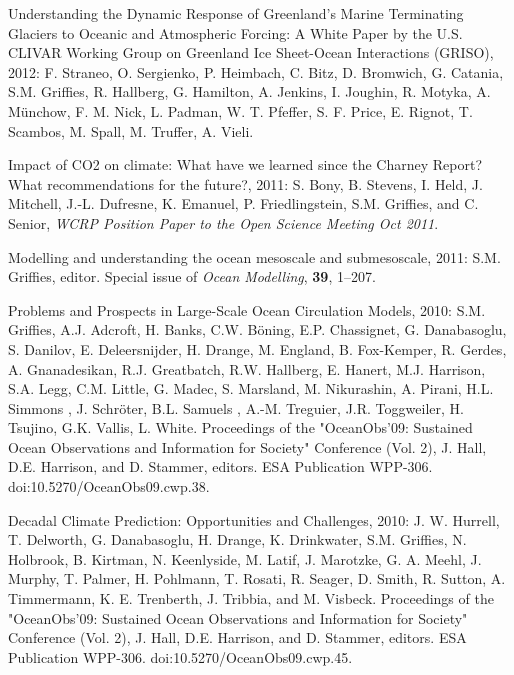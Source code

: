 \begin{etaremune}
\item Understanding the Dynamic Response of Greenland’s Marine
  Terminating Glaciers to Oceanic and Atmospheric Forcing: A White
  Paper by the U.S. CLIVAR Working Group on Greenland Ice Sheet-Ocean
  Interactions (GRISO), 2012: F. Straneo, O. Sergienko, P. Heimbach,
  C. Bitz, D. Bromwich, G. Catania, S.M. Grif\/f\/ies, R.
  Hallberg, G. Hamilton, A. Jenkins, I. Joughin, R. Motyka,
  A. Münchow, F. M. Nick, L. Padman, W. T. Pfeffer, S. F. Price,
  E. Rignot, T. Scambos, M. Spall, M. Truffer, A. Vieli.

\item Impact of CO2 on climate: What have we learned since the Charney
  Report?  What recommendations for the future?, 2011: S. Bony,
  B. Stevens, I. Held, J. Mitchell, J.-L. Dufresne, K. Emanuel,
  P. Friedlingstein, S.M. Grif\/f\/ies, and C. Senior, {\it WCRP
    Position Paper to the Open Science Meeting Oct 2011}.

\item Modelling and understanding the ocean mesoscale and
  submesoscale, 2011: S.M. Grif\/f\/ies, editor. Special issue of
  {\it Ocean Modelling}, {\bf 39}, 1--207.

\item Problems and Prospects in Large-Scale Ocean Circulation Models,
  2010: S.M. Grif\/f\/ies, A.J. Adcroft, H. Banks, C.W. B\"oning,
 E.P. Chassignet, G. Danabasoglu, S.  Danilov, E. Deleersnijder,
  H. Drange, M. England, B. Fox-Kemper, R. Gerdes, A.  Gnanadesikan,
  R.J. Greatbatch, R.W. Hallberg, E. Hanert, M.J. Harrison, S.A. Legg,
  C.M.  Little, G. Madec, S. Marsland, M. Nikurashin, A. Pirani,
  H.L. Simmons , J. Schr\"oter, B.L.  Samuels , A.-M. Treguier,
  J.R. Toggweiler, H. Tsujino, G.K. Vallis, L. White.  Proceedings of
  the "OceanObs’09: Sustained Ocean Observations and Information for
  Society" Conference (Vol. 2), J. Hall, D.E. Harrison, and
  D. Stammer, editors. ESA Publication WPP-306.
  doi:10.5270/OceanObs09.cwp.38.

\item Decadal Climate Prediction: Opportunities and Challenges, 2010:
  J. W. Hurrell, T. Delworth, G. Danabasoglu, H. Drange,
  K. Drinkwater, S.M. Grif\/f\/ies, N. Holbrook, B. Kirtman,
  N. Keenlyside, M. Latif, J. Marotzke, G. A. Meehl, J. Murphy,
  T. Palmer, H. Pohlmann, T. Rosati, R. Seager, D. Smith, R. Sutton,
  A. Timmermann, K. E. Trenberth, J. Tribbia, and M. Visbeck.
  Proceedings of the "OceanObs’09: Sustained Ocean Observations and
  Information for Society" Conference (Vol. 2), J. Hall,
  D.E. Harrison, and D. Stammer, editors. ESA Publication WPP-306.
  doi:10.5270/OceanObs09.cwp.45.


\end{etaremune}

